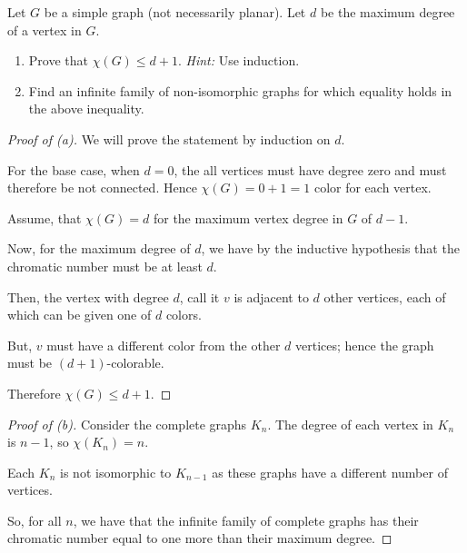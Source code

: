 \documentclass[../hw7]{subfiles}
\begin{document}
\begin{problem}
\item Let $G$ be a simple graph (not necessarily planar). Let $d$ be the maximum degree of a vertex in $G$.
\begin{enumerate}
	\item Prove that $\chi(G) \le d+1$. \emph{Hint:} Use induction.
	\item Find an infinite family of non-isomorphic graphs for which equality holds in the above inequality.
\end{enumerate}
\end{problem}
\begin{proof}[Proof of (a)]
	We will prove the statement by induction on $d$.

	For the base case, when $d=0$, the all vertices must have degree zero and must therefore be not connected. Hence  $\chi(G)=0+1=1$ color for each vertex.

	Assume, that $\chi(G)=d$ for the maximum vertex degree in $G$ of $d-1$.

	Now, for the maximum degree of $d$, we have by the inductive hypothesis that the chromatic number must be at least $d$.

	Then, the vertex with degree $d$, call it $v$ is adjacent to  $d$ other vertices, each of which can be given one of  $d$ colors.

	But, $v$ must have a different color from the other $d$ vertices;
	hence the graph must be  $(d+1)$-colorable.

	Therefore  $\chi(G)\le d+1$.
\end{proof}
\begin{proof}[Proof of (b)]
	Consider the complete graphs $K_n$.
	The degree of each vertex in  $K_n$ is  $n-1$, so $\chi(K_n)=n$.

	Each $K_n$ is not isomorphic to  $K_{n-1}$ as these graphs have a different number of vertices.

	So, for all $n$, we have that the infinite family of complete graphs has their chromatic number equal to one more than their maximum degree.
\end{proof}
\end{document}
